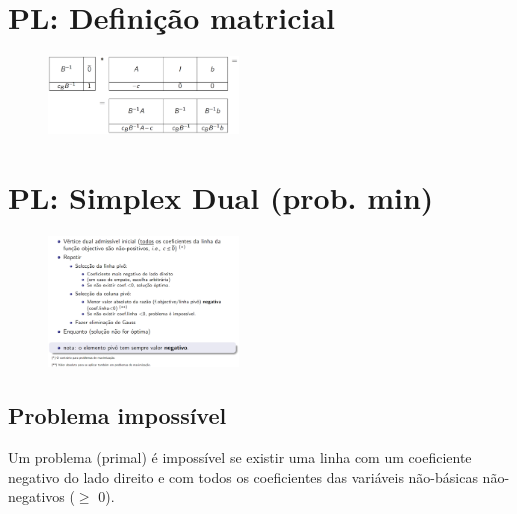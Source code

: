 \documentclass[10pt, a4paper]{article}
\begin{document}
 
\begin{multicols}{2}

\begin{center}
\end{center}

\thispagestyle{empty}



\section{PL: Definição matricial}

\begin{figure}[H]
    \centering
    \includegraphics[width=0.45\textwidth]{quadro_simplex.png}
\end{figure}



\section{PL: Simplex Dual (prob. min)}

\begin{figure}[H]
    \centering
    \includegraphics[width=0.45\textwidth]{simplex_dual.png}
\end{figure}

\subsection{Problema impossível}

Um problema (primal) é impossível se existir uma linha com um coeficiente negativo do lado direito e com todos os coeficientes das variáveis não-básicas não-negativos (\(\ge\) 0).




\end{multicols}
\end{document}
